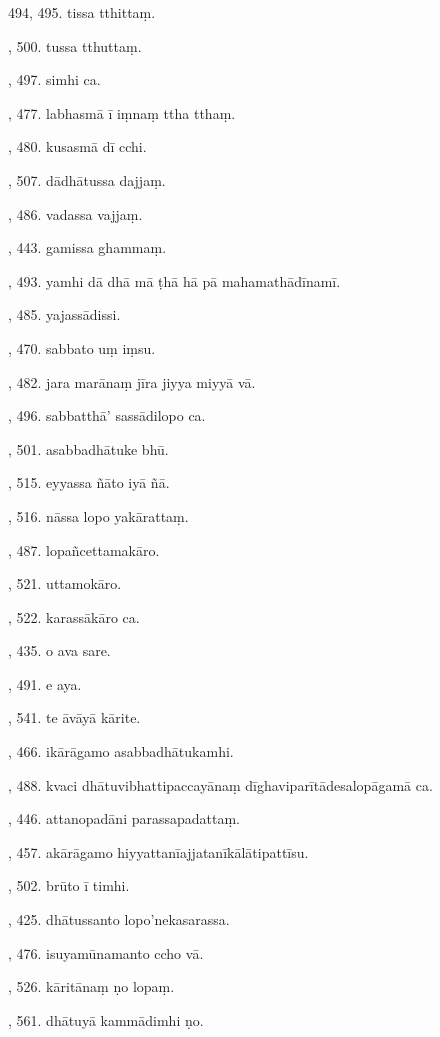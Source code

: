 494, 495. tissa tthittaṃ.\par {}, 500. tussa tthuttaṃ.\par {}, 497. simhi ca.\par {}, 477. labhasmā ī iṃnaṃ ttha tthaṃ.\par {}, 480. kusasmā dī cchi.\par {}, 507. dādhātussa dajjaṃ.\par {}, 486. vadassa vajjaṃ.\par {}, 443. gamissa ghammaṃ.\par {}, 493. yamhi dā dhā mā ṭhā hā pā mahamathādīnamī.\par {}, 485. yajassādissi.\par {}, 470. sabbato uṃ iṃsu.\par {}, 482. jara marānaṃ jīra jiyya miyyā vā.\par {}, 496. sabbatthā’ sassādilopo ca.\par {}, 501. asabbadhātuke bhū.\par {}, 515. eyyassa ñāto iyā ñā.\par {}, 516. nāssa lopo yakārattaṃ.\par {}, 487. lopañcettamakāro.\par {}, 521. uttamokāro.\par {}, 522. karassākāro ca.\par {}, 435. o ava sare.\par {}, 491. e aya.\par {}, 541. te āvāyā kārite.\par {}, 466. ikārāgamo asabbadhātukamhi.\par {}, 488. kvaci dhātuvibhattipaccayānaṃ dīghaviparītādesalopāgamā ca.\par {}, 446. attanopadāni parassapadattaṃ.\par {}, 457. akārāgamo hiyyattanīajjatanīkālātipattīsu.\par {}, 502. brūto ī timhi.\par {}, 425. dhātussanto lopo’nekasarassa.\par {}, 476. isuyamūnamanto ccho vā.\par {}, 526. kāritānaṃ ṇo lopaṃ.\par {}, 561. dhātuyā kammādimhi ṇo.\par \noindent
